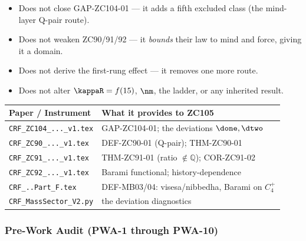 \documentclass[12pt, a4paper]{article}
\begin{document}
\begin{keybox}[title={What ZC105 Does NOT Do}]
\begin{itemize}[leftmargin=2em, noitemsep]
  \item Does not close GAP-ZC104-01 --- it adds a fifth excluded class
    (the mind-layer Q-pair route).
  \item Does not weaken ZC90/91/92 --- it \emph{bounds} their law to mind and
    force, giving it a domain.
  \item Does not derive the first-rung effect --- it removes one more route.
  \item Does not alter $\kappaR=f(15)$, $\nm$, the ladder, or any inherited
    result.
\end{itemize}
\end{keybox}

\begin{keybox}[title={Companion Papers --- ZC105}]
{\small\renewcommand{\arraystretch}{1.25}
\begin{center}
\begin{tabular}{@{}p{5.0cm}p{7.5cm}@{}}
\toprule
\textbf{Paper / Instrument} & \textbf{What it provides to ZC105} \\
\midrule
\texttt{CRF\_ZC104\_...\_v1.tex}   & GAP-ZC104-01; the deviations $\done,\dtwo$ \\
\texttt{CRF\_ZC90\_...\_v1.tex}    & DEF-ZC90-01 (Q-pair); THM-ZC90-01 \\
\texttt{CRF\_ZC91\_...\_v1.tex}    & THM-ZC91-01 (ratio $\notin\mathbb{Q}$); COR-ZC91-02 \\
\texttt{CRF\_ZC92\_...\_v1.tex}    & Barami functional; history-dependence \\
\texttt{CRF\_..Part\_F.tex}        & DEF-MB03/04: visesa/nibbedha, Barami on $C_4^+$ \\
\texttt{CRF\_MassSector\_V2.py}    & the deviation diagnostics \\
\bottomrule
\end{tabular}
\end{center}}
\end{keybox}

\subsubsection{Pre-Work Audit (PWA-1 through PWA-10)}
\end{document}
